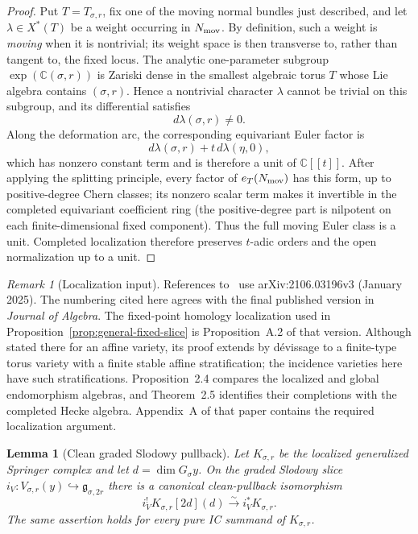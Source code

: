 \documentclass[11pt]{amsart}
\newtheorem{lemma}[theorem]{Lemma}
\theoremstyle{definition}
\theoremstyle{remark}
\newtheorem{remark}[theorem]{Remark}
\begin{document}
\begin{proof}
Put $T=T_{\sigma,r}$, fix one of the moving normal bundles just described,
and let
$\lambda\in X^*(T)$ be a weight occurring in $N_{\rm mov}$.  By definition,
such a weight is \emph{moving} when it is nontrivial; its weight space is
then transverse to, rather than tangent to, the fixed locus.  The analytic
one-parameter subgroup $\exp(\mathbb C(\sigma,r))$ is Zariski dense in the
smallest algebraic torus $T$ whose Lie algebra contains $(\sigma,r)$.  Hence
a nontrivial character $\lambda$ cannot be trivial on this subgroup, and its
differential satisfies
\[
 d\lambda(\sigma,r)\ne0.
\]
Along the deformation arc, the corresponding equivariant Euler factor is
\[
 d\lambda(\sigma,r)+t\,d\lambda(\eta,0),
\]
which has nonzero constant term and is therefore a unit of
$\mathbb C[[t]]$.  After applying the splitting principle, every factor of
$e_T(N_{\rm mov})$ has this form, up to positive-degree Chern classes; its
nonzero scalar term makes it invertible in the completed equivariant
coefficient ring (the positive-degree part is nilpotent on each
finite-dimensional fixed component).  Thus the full moving Euler class is a
unit.  Completed
localization therefore preserves $t$-adic orders and the open normalization
up to a unit.
\end{proof}

\begin{remark}[Localization input]
\label{rem:solleveld-version}
References to~\cite{Solleveld} use arXiv:2106.03196v3 (January 2025).  The
numbering cited here agrees with the final published version in
\emph{Journal of Algebra}.  The
fixed-point homology localization used in
Proposition~\ref{prop:general-fixed-slice} is Proposition~A.2 of that
version.  Although stated there for an affine variety, its proof extends by
d\'evissage to a finite-type torus variety with a finite stable affine
stratification; the incidence varieties here have such stratifications.
Proposition~2.4 compares the localized and global endomorphism
algebras, and Theorem~2.5 identifies their completions with the completed
Hecke algebra.  Appendix~A of that paper contains the required localization
argument.
\end{remark}

\begin{lemma}[Clean graded Slodowy pullback]
\label{lem:general-clean-slodowy}
Let $K_{\sigma,r}$ be the localized generalized Springer complex and let
$d=\dim G_\sigma y$.  On the graded Slodowy slice
$i_V:V_{\sigma,r}(y)\hookrightarrow\mathfrak g_{\sigma,2r}$ there is a
canonical clean-pullback isomorphism
\[
 i_V^!K_{\sigma,r}[2d](d)\xrightarrow{\sim}i_V^*K_{\sigma,r}.
\]
The same assertion holds for every pure IC summand of $K_{\sigma,r}$.
\end{lemma}
\end{document}
